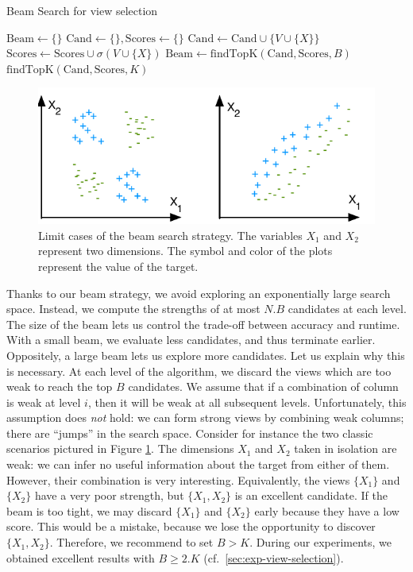 \begin{algorithm}[t]
\caption{Beam Search for view selection}
\label{algo:beam_search}
\begin{algorithmic}
    \State $\text{Beam} \gets \{\}$
        \State $\text{Cand} \gets \{\}, \text{Scores} \gets \{\}$
            \State $\text{Cand} \gets \text{Cand} \cup \{V \cup \{X\} \}$
            \State $\text{Scores} \gets \text{Scores} \cup \sigma(V \cup \{X\}) $
            \EndFor
        \EndFor
        \State $\text{Beam} \gets \text{findTopK}(\text{Cand}, \text{Scores}, B)$
    \EndFor
    \State \Return $\text{findTopK}(\text{Cand}, \text{Scores}, K)$
    \EndFunction
\end{algorithmic}
\end{algorithm}
\begin{figure}[t!]
\centering
\includegraphics[width=0.8\columnwidth]{images/strength-jump}
\caption{Limit cases of the beam search strategy. The variables $X_1$ and
$X_2$ represent two dimensions. The symbol and color of the plots represent
the value of the target. }
\label{pic:strength-jump}
\end{figure}
Thanks to our beam strategy, we avoid exploring an exponentially large search
space. Instead, we compute the strengths of at most $N.B$ candidates at each
level. The size of the beam lets us control the trade-off between accuracy and
runtime. With a small beam, we evaluate less candidates, and thus terminate
earlier. Oppositely, a large beam lets us explore more candidates.  Let us
explain why this is necessary. At each level of the algorithm, we discard the
views which are too weak to reach the top $B$ candidates. We assume that if a
combination of column is weak at level $i$, then it will be weak at all
subsequent levels.  Unfortunately, this assumption does \emph{not} hold: we can
form strong views by combining weak columns; there are ``jumps'' in the search
space.  Consider for instance the two classic scenarios pictured in Figure
\ref{pic:strength-jump}.  The dimensions $X_1$ and $X_2$ taken in isolation are
weak: we can infer no useful information about the target from either of them.
However, their combination is very interesting. Equivalently, the views
$\{X_1\}$ and $\{X_2\}$ have a very poor strength, but $\{X_1, X_2\}$ is an
excellent candidate. If the beam is too tight, we may discard $\{X_1\}$ and
$\{X_2\}$ early because they have a low score.  This would be a mistake,
because we lose the opportunity to discover $\{X_1, X_2\}$. Therefore, we
recommend to set $B > K$. During our experiments, we obtained excellent results
with $B \geq 2.K$ (cf.~\ref{sec:exp-view-selection}).

